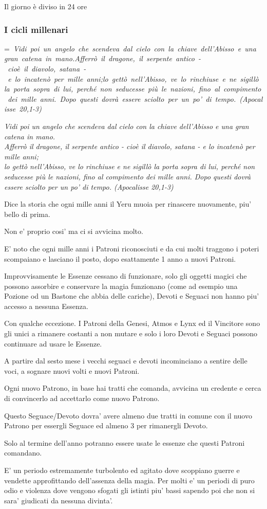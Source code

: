 \documentclass[a4paper,11pt,twoside,openany]{book}
\makeatletter
\newcommand{\mybox}[1]{%
	\setbox0=\hbox{#1}%
	\setlength{\@tempdima}{\dimexpr\wd0+13pt}%
	\begin{tcolorbox}[boxrule=0.5pt,arc=4pt, breakable,enhanced,
		left=6pt,right=6pt,top=6pt,bottom=6pt,boxsep=0pt,width=\@tempdima]
		#1
	\end{tcolorbox}
}
\makeatother
\begin{document}
{Il giorno è diviso in 24 ore


\subsubsection{I cicli millenari}

\mybox{\textit{
Vidi poi un angelo che scendeva dal cielo con la chiave dell'Abisso e una gran catena in mano.\\
Afferrò il dragone, il serpente antico - cioè il diavolo, satana - e lo incatenò per mille anni; \\
lo gettò nell'Abisso, ve lo rinchiuse e ne sigillò la porta sopra di lui, perché non seducesse più le nazioni, fino al compimento dei mille anni. Dopo questi dovrà essere sciolto per un po' di tempo. (Apocalisse 20,1-3)
}}\medskip


Dice la storia che ogni mille anni il Yeru muoia per rinascere nuovamente, piu' bello di prima.

Non e' proprio cosi' ma ci si avvicina molto.

E' noto che ogni mille anni i Patroni riconosciuti e da cui molti traggono i poteri scompaiano e lasciano il posto, dopo esattamente 1 anno a nuovi Patroni.

Improvvisamente le Essenze cessano di funzionare, solo gli oggetti magici che possono assorbire e conservare la magia funzionano (come ad esempio una Pozione od un Bastone che abbia delle cariche), Devoti e Seguaci non hanno piu' accesso a nessuna Essenza.

Con qualche eccezione. I Patroni della Genesi, Atmos e Lynx  ed il Vincitore sono gli unici a rimanere costanti a non mutare e solo i loro Devoti e Seguaci possono continuare ad usare le Essenze.

A partire dal sesto mese i vecchi seguaci e devoti incominciano a sentire delle voci, a sognare nuovi volti e nuovi Patroni.

Ogni nuovo Patrono, in base hai tratti che comanda, avvicina un credente e cerca di convincerlo ad accettarlo come nuovo Patrono.

Questo Seguace/Devoto dovra' avere almeno due tratti in comune con il nuovo Patrono per essergli Seguace ed almeno 3 per rimanergli Devoto.

Solo al termine dell'anno potranno essere usate le essenze che questi Patroni comandano.

E' un periodo estremamente turbolento ed agitato dove scoppiano guerre e vendette approfittando dell'assenza della magia. Per molti e' un periodi di puro odio e violenza dove vengono sfogati gli istinti piu' bassi sapendo poi che non si sara' giudicati da nessuna divinta'.

}
\end{document}
